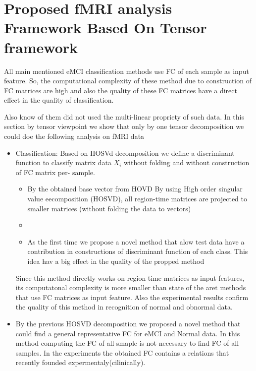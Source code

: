 \documentclass[journal]{IEEEtran}
\begin{document}
	\section{Proposed fMRI analysis Framework Based On Tensor framework}
	{\color{blue}
		All main mentioned eMCI classification methods use FC of each sample as input feature. So, the computational complexity of these method due to construction of FC matrices are high and also the quality  of these FC matrices have a direct effect in the quality of classification.
		
		Also know of them did not used the multi-linear propriety of such data. In this section by tensor viewpoint we show that only by one tensor decomposition we could doe the following analysis on fMRI data
		\begin{itemize}
			\item Classification: Based on  HOSVd decomposition we define a discriminant function to classify matrix data $X_i$ without folding  and  without construction of FC matrix per- sample. 
			\begin{itemize}
				\item By the obtained base vector from HOVD  By using High order singular value eecomposition (HOSVD), all region-time matrices are projected to
				smaller matrices (without folding the data to vectors)
				\item 
				\item As the first time we propose a novel method that alow test data have a contribution in constructions of discriminant function of each class. This idea hav a big effect in the quality of the propped method
			\end{itemize}
			Since this method directly works on region-time matrices as input features, its computatonal complexity is more smaller than state of the aret methods that use FC matrices as input feature. Also the experimental results confirm the quality of this method in recognition of normal and obnormal data.
			\item  By the previous HOSVD decomposition we proposed a novel method that could 
			find a general representative FC for eMCI and Normal data. In this method computing the FC of all smaple is not necessary to find FC of all samples. 
			{\color{red} In the experiments the obtained FC contains a relations that recently  
				founded expermentaly(cilinically).} 
		\end{itemize}
	}
\end{document}
